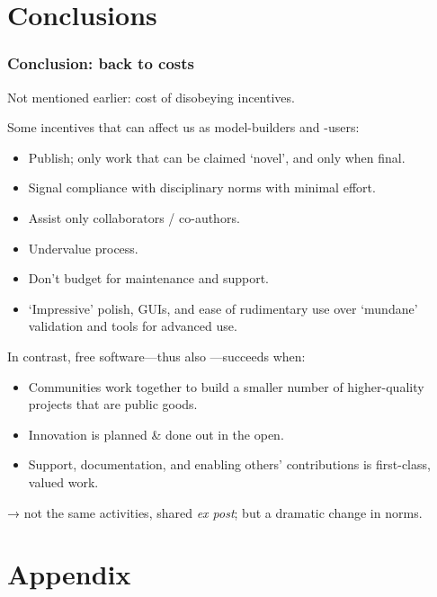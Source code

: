 \documentclass[12pt,aspectratio=169]{beamer}
\begin{document}
\section{Conclusions}
\begin{frame}[allowframebreaks]
\frametitle{Conclusion: back to costs}
Not mentioned earlier: cost of disobeying incentives.

\bigskip
Some incentives that can affect us as model-builders and -users:
\begin{itemize}
  \item Publish; only work that can be claimed ‘novel’, and only when final.
  \item Signal compliance with disciplinary norms with minimal effort.
  \item Assist only collaborators / co-authors.
  \item Undervalue process.
  \item Don't budget for maintenance and support.
  \item ‘Impressive’ polish, GUIs, and ease of rudimentary use over ‘mundane’ validation and tools for advanced use.
\end{itemize}

\framebreak
In contrast, free software—thus also —succeeds when:
\begin{itemize}
  \item Communities work together to build a smaller number of higher-quality projects that are public goods.
  \item Innovation is planned \& done out in the open.
  \item Support, documentation, and enabling others' contributions is first-class, valued work.
\end{itemize}

\bigskip
→ not the same activities, shared \emph{ex post}; but a dramatic change in norms.

\bigskip
\hfill {\Large {}}
\end{frame}

\appendix

\section{Appendix}
\end{document}
